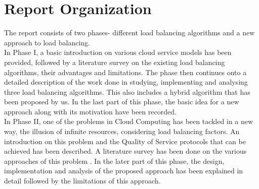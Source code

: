 \section{Report Organization}
The report consists of two phases- different load balancing algorithms and a new approach to load balancing.\\[0.2cm]
In Phase I, a basic introduction on various cloud service models has been provided, followed by a literature survey on the existing load balancing algorithms, their advantages and limitations. The phase then continues onto a detailed description of the work done in studying, implementing and analysing three load balancing algorithms. This also includes a hybrid algorithm that has been proposed by us. In the last part of this phase, the basic idea for a new approach along with its motivation have been recorded.\\[0.2cm]
In Phase II, one of the problems in Cloud Computing has been tackled in a new way, the illusion of infinite resources, considering load balancing factors. An introduction on this problem and the Quality of Service protocols that can be achieved has been described. A literature survey has been done on the various approaches of this problem . In the later part of this phase, the design, implementation and analysis of the proposed approach has been explained in detail followed by the limitations of this approach.\\[0.2cm]


